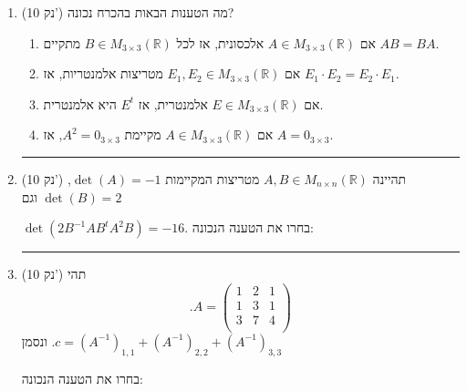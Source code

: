 \documentclass[12pt, a4paper]{article}
\newcommand{\ntn}{n\times n}
\newcommand{\rr}{\mathbb{R}}
\newcommand{\points}[1]{(#1 נק') }
\begin{document}
\begin{enumerate}
\noindent\rule{\textwidth-30pt}{0.4pt}



\item\points{10}
מה הטענות הבאות בהכרח נכונה?
\begin{enumerate}
\item
אם
$A\in M_{3\times 3}(\rr)$
אלכסונית, אז לכל
$B\in M_{3\times 3}(\rr)$
מתקיים
$AB=BA$.
\item
אם
$E_1,E_2\in M_{3\times 3}(\rr)$
מטריצות אלמנטריות, אז
$E_1\cdot E_2= E_2\cdot E_1$.

\item
אם 
$E\in M_{3\times3}(\rr)$
אלמנטרית,
אז
$E^t$
היא אלמנטרית.
\item
אם
$A\in M_{3\times 3}(\rr)$
מקיימת
$A^2=0_{3\times 3}$,
אז
$A=0_{3\times 3}$.
\end{enumerate}



\noindent\rule{\textwidth-30pt}{0.4pt}

\item\points{10}
תהיינה
$A,B\in M_{\ntn}(\rr)$
מטריצות המקיימות
$\det(A)=-1$,
$\det(B)=2$
וגם

$\det(2B^{-1}AB^tA^2B)=-16$.
בחרו את הטענה הנכונה:
\begin{enumerate}
\end{enumerate}


\noindent\rule{\textwidth-30pt}{0.4pt}



\item\points{10}
תהי
$$.A=\begin{pmatrix}
1&2&1\\
1&3&1\\
3&7&4\\
\end{pmatrix}$$
ונסמן
$.c= (A^{-1})_{1,1}+(A^{-1})_{2,2}+(A^{-1})_{3,3}$

בחרו את הטענה הנכונה:
\begin{enumerate}
\end{enumerate}


\end{enumerate}
\end{document}
